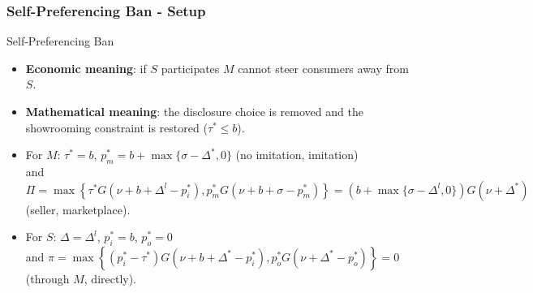 \begin{frame}
  \frametitle{Self-Preferencing Ban - Setup}
  \footnotesize

  \begin{block}{Self-Preferencing Ban}
    \begin{itemize}
      \item \textbf{Economic meaning}: if $S$ participates $M$ cannot steer consumers away from $S$.
      \item \textbf{Mathematical meaning}: the disclosure choice is removed and the showrooming constraint is restored ($\tau^*\leq b$).
    \end{itemize}
  \end{block}

  \begin{itemize}
    \item For $M$: $\tau^* = b$, $p^*_m = b + \max\{\sigma - \Delta^*, 0\} $ (no imitation, imitation) \\
    and $\Pi = \max\left\{ \tau^* G(\nu + b +\Delta^l - p^*_i), p^*_m G(\nu + b + \sigma - p^*_m) \right\} = {(b+\max\{\sigma-\Delta^l,0\}) G(\nu + \Delta^*)}$  (seller, marketplace).
    \item For $S$: $\Delta = \Delta^l$, $p^*_i = b$, $p^*_o = 0$ \\
    and $\pi = \max \left\{ (p^*_i -\tau^*) G(\nu + b + \Delta^* - p^*_i), p^*_o G(\nu + \Delta^* - p^*_o ) \right\} = {0}$ (through $M$, directly).
  \end{itemize}
  
  \begin{table}
  \centering
  \scriptsize
\end{table}
  
\end{frame}

